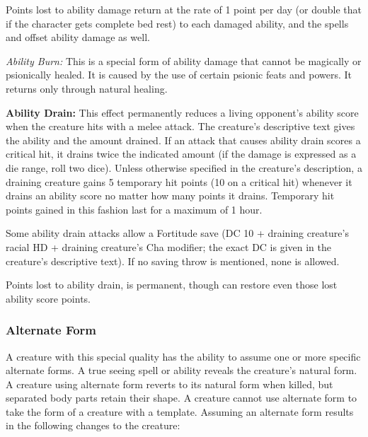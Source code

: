 Points lost to ability damage return at the rate of 1 point per day (or double that if the character gets complete bed rest) to each damaged ability, and the spells  and  offset ability damage as well.

\textit{Ability Burn:} This is a special form of ability damage that cannot be magically or psionically healed. It is caused by the use of certain psionic feats and powers. It returns only through natural healing.

\textbf{Ability Drain:} This effect permanently reduces a living opponent's ability score when the creature hits with a melee attack. The creature's descriptive text gives the ability and the amount drained. If an attack that causes ability drain scores a critical hit, it drains twice the indicated amount (if the damage is expressed as a die range, roll two dice). Unless otherwise specified in the creature's description, a draining creature gains 5 temporary hit points (10 on a critical hit) whenever it drains an ability score no matter how many points it drains. Temporary hit points gained in this fashion last for a maximum of 1 hour.

Some ability drain attacks allow a Fortitude save (DC 10 + \onehalf draining creature's racial HD + draining creature's Cha modifier; the exact DC is given in the creature's descriptive text). If no saving throw is mentioned, none is allowed.

Points lost to ability drain, is permanent, though  can restore even those lost ability score points.

\subsubsection{Alternate Form}
A creature with this special quality has the ability to assume one or more specific alternate forms. A true seeing spell or ability reveals the creature's natural form. A creature using alternate form reverts to its natural form when killed, but separated body parts retain their shape. A creature cannot use alternate form to take the form of a creature with a template. Assuming an alternate form results in the following changes to the creature:

